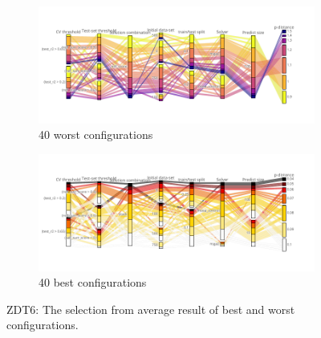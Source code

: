     \begin{figure}
        \centering
        \begin{subfigure}{\textwidth}
            \includegraphics[width=\textwidth]{content/images/conf_zdt6_worst}
            \caption{40 worst configurations}
            \label{fig:conf_zdt6_worst}
        \end{subfigure} 
        
        \begin{subfigure}{\textwidth}
            \includegraphics[width=\textwidth]{content/images/conf_zdt6_best}
            \caption{40 best configurations}
            \label{fig:conf_zdt6_best}
        \end{subfigure} 

        \caption[ZDT6: The selection from average result of best and worst configurations.]{ZDT6: The selection from average result of best and worst configurations.}
        \label{fig:conf_zdt6}    
    \end{figure}

